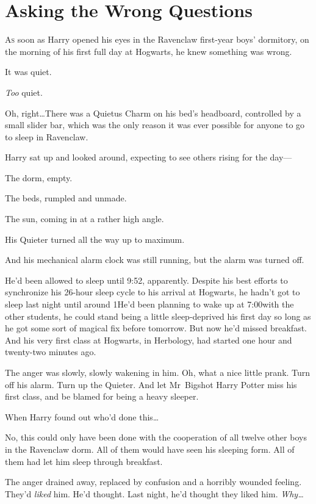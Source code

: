 \chapter{Asking the Wrong Questions}

\lettrine{A}{s} soon as Harry opened his eyes in the Ravenclaw first-year boys’ dormitory, on the morning of his first full day at Hogwarts, he knew something was wrong.

It was quiet.

\emph{Too} quiet.

Oh, right…There was a Quietus Charm on his bed’s headboard, controlled by a small slider bar, which was the only reason it was ever possible for anyone to go to sleep in Ravenclaw.

Harry sat up and looked around, expecting to see others rising for the day—

The dorm, empty.

The beds, rumpled and unmade.

The sun, coming in at a rather high angle.

His Quieter turned all the way up to maximum.

And his mechanical alarm clock was still running, but the alarm was turned off.

He’d been allowed to sleep until 9:52\am, apparently. Despite his best efforts to synchronize his 26-hour sleep cycle to his arrival at Hogwarts, he hadn’t got to sleep last night until around 1\am He’d been planning to wake up at 7:00\am with the other students, he could stand being a little sleep-deprived his first day so long as he got some sort of magical fix before tomorrow. But now he’d missed breakfast. And his very first class at Hogwarts, in Herbology, had started one hour and twenty-two minutes ago.

The anger was slowly, slowly wakening in him. Oh, what a nice little prank. Turn off his alarm. Turn up the Quieter. And let Mr~Bigshot Harry Potter miss his first class, and be blamed for being a heavy sleeper.

When Harry found out who’d done this…

No, this could only have been done with the cooperation of all twelve other boys in the Ravenclaw dorm. All of them would have seen his sleeping form. All of them had let him sleep through breakfast.

The anger drained away, replaced by confusion and a horribly wounded feeling. They’d \emph{liked} him. He’d thought. Last night, he’d thought they liked him. \emph{Why…}


